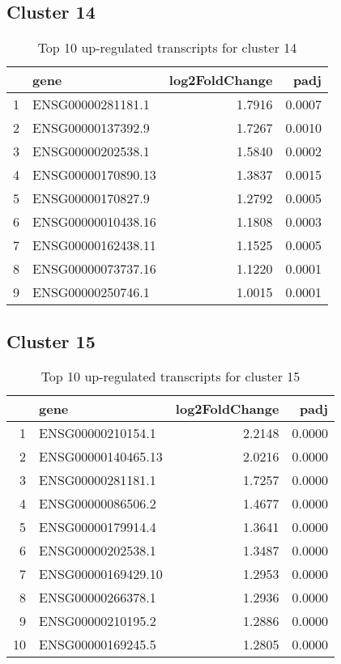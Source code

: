 \documentclass{article}
\begin{document}
\subsection{Cluster 14 }
\begin{table}[H]
\centering
\begin{tabular}{rlrr}
  \hline
 & gene & log2FoldChange & padj \\ 
  \hline
1 & ENSG00000281181.1 & 1.7916 & 0.0007 \\ 
  2 & ENSG00000137392.9 & 1.7267 & 0.0010 \\ 
  3 & ENSG00000202538.1 & 1.5840 & 0.0002 \\ 
  4 & ENSG00000170890.13 & 1.3837 & 0.0015 \\ 
  5 & ENSG00000170827.9 & 1.2792 & 0.0005 \\ 
  6 & ENSG00000010438.16 & 1.1808 & 0.0003 \\ 
  7 & ENSG00000162438.11 & 1.1525 & 0.0005 \\ 
  8 & ENSG00000073737.16 & 1.1220 & 0.0001 \\ 
  9 & ENSG00000250746.1 & 1.0015 & 0.0001 \\ 
   \hline
\end{tabular}
\caption{Top 10 up-regulated transcripts for cluster 14} 
\label{tab:q3_1_14}
\end{table}
\subsection{Cluster 15 }
\begin{table}[H]
\centering
\begin{tabular}{rlrr}
  \hline
 & gene & log2FoldChange & padj \\ 
  \hline
1 & ENSG00000210154.1 & 2.2148 & 0.0000 \\ 
  2 & ENSG00000140465.13 & 2.0216 & 0.0000 \\ 
  3 & ENSG00000281181.1 & 1.7257 & 0.0000 \\ 
  4 & ENSG00000086506.2 & 1.4677 & 0.0000 \\ 
  5 & ENSG00000179914.4 & 1.3641 & 0.0000 \\ 
  6 & ENSG00000202538.1 & 1.3487 & 0.0000 \\ 
  7 & ENSG00000169429.10 & 1.2953 & 0.0000 \\ 
  8 & ENSG00000266378.1 & 1.2936 & 0.0000 \\ 
  9 & ENSG00000210195.2 & 1.2886 & 0.0000 \\ 
  10 & ENSG00000169245.5 & 1.2805 & 0.0000 \\ 
   \hline
\end{tabular}
\caption{Top 10 up-regulated transcripts for cluster 15} 
\label{tab:q3_1_15}
\end{table}
\end{document}
